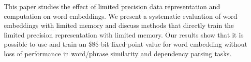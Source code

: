 This paper studies the effect of limited precision data representation and computation on word embeddings. We present a systematic evaluation of word embeddings with limited memory and discuss methods that directly train the limited precision representation with limited memory. Our results show that it is possible to use and train an \$8\$-bit fixed-point value for word embedding without loss of performance in word/phrase similarity and dependency parsing tasks.
